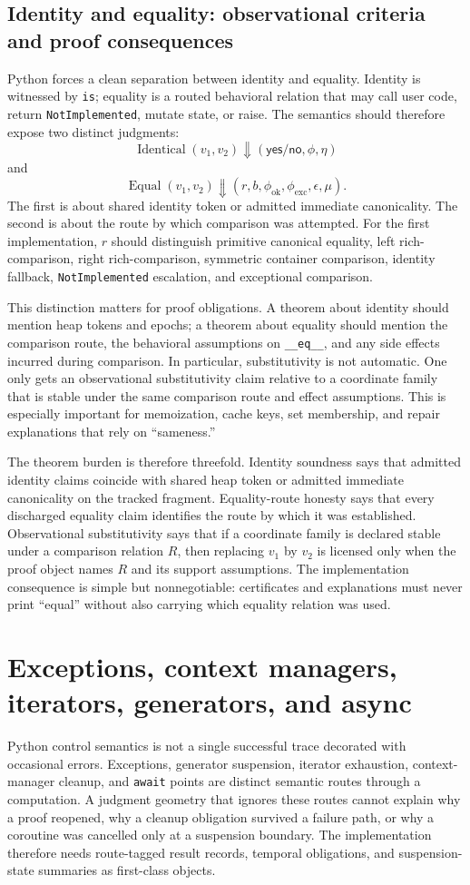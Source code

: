 \documentclass[11pt]{report}
\begin{document}
\section{Identity and equality: observational criteria and proof consequences}
Python forces a clean separation between identity and equality. Identity is witnessed by \texttt{is}; equality is a routed behavioral relation that may call user code, return \texttt{NotImplemented}, mutate state, or raise. The semantics should therefore expose two distinct judgments:
\[
\operatorname{Identical}(v_1,v_2) \Downarrow (\mathsf{yes/no},\phi,\eta)
\]
and
\[
\operatorname{Equal}(v_1,v_2) \Downarrow (r,b,\phi_{\mathrm{ok}},\phi_{\mathrm{exc}},\epsilon,\mu).
\]
The first is about shared identity token or admitted immediate canonicality. The second is about the route by which comparison was attempted. For the first implementation, $r$ should distinguish primitive canonical equality, left rich-comparison, right rich-comparison, symmetric container comparison, identity fallback, \texttt{NotImplemented} escalation, and exceptional comparison.

This distinction matters for proof obligations. A theorem about identity should mention heap tokens and epochs; a theorem about equality should mention the comparison route, the behavioral assumptions on \texttt{\_\_eq\_\_}, and any side effects incurred during comparison. In particular, substitutivity is not automatic. One only gets an observational substitutivity claim relative to a coordinate family that is stable under the same comparison route and effect assumptions. This is especially important for memoization, cache keys, set membership, and repair explanations that rely on ``sameness.''

The theorem burden is therefore threefold. Identity soundness says that admitted identity claims coincide with shared heap token or admitted immediate canonicality on the tracked fragment. Equality-route honesty says that every discharged equality claim identifies the route by which it was established. Observational substitutivity says that if a coordinate family is declared stable under a comparison relation $R$, then replacing $v_1$ by $v_2$ is licensed only when the proof object names $R$ and its support assumptions. The implementation consequence is simple but nonnegotiable: certificates and explanations must never print ``equal'' without also carrying which equality relation was used.
\chapter{Exceptions, context managers, iterators, generators, and async}
Python control semantics is not a single successful trace decorated with occasional errors. Exceptions, generator suspension, iterator exhaustion, context-manager cleanup, and \texttt{await} points are distinct semantic routes through a computation. A judgment geometry that ignores these routes cannot explain why a proof reopened, why a cleanup obligation survived a failure path, or why a coroutine was cancelled only at a suspension boundary. The implementation therefore needs route-tagged result records, temporal obligations, and suspension-state summaries as first-class objects.
\end{document}
